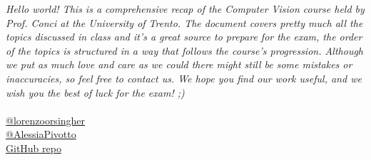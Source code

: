 \textit{Hello world! This is a comprehensive recap of the Computer Vision course held by Prof. Conci at the University of Trento. The document covers pretty much all the topics discussed in class and it's a great source to prepare for the exam, the order of the topics is structured in a way that follows the course's progression. Although we put as much love and care as we could there might still be some mistakes or inaccuracies, so feel free to contact us. We hope you find our work useful, and we wish you the best of luck for the exam! ;)}
\\\\
\href{https://github.com/lorenzoorsingher}{\color{blue}@lorenzoorsingher}\\
\href{https://github.com/AlessiaPivotto}{\color{blue}@AlessiaPivotto}\\
\href{https://github.com/AlessiaPivotto/ComputerVision}{\color{blue}GitHub repo}